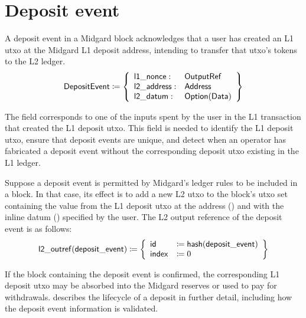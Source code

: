 \documentclass[../midgard.tex]{subfiles}
\begin{document}
\section{Deposit event}
\label{h:deposit-event}

A deposit event in a Midgard block acknowledges that a user has created an L1 utxo at the Midgard L1 deposit address, intending to transfer that utxo's tokens to the L2 ledger.
\begin{equation*}
    \mathsf{DepositEvent} \coloneq \left\{
    \begin{array}{ll}
        \mathsf{l1\_nonce} : & \mathsf{OutputRef} \\
        \mathsf{l2\_address} : & \mathsf{Address} \\
        \mathsf{l2\_datum} : & \mathsf{Option(Data)} \\
    \end{array} \right\}
\end{equation*}

The  field corresponds to one of the inputs spent by the user in the L1 transaction that created the L1 deposit utxo. This field is needed to identify the L1 deposit utxo, ensure that deposit events are unique, and detect when an operator has fabricated a deposit event without the corresponding deposit utxo existing in the L1 ledger.

Suppose a deposit event is permitted by Midgard's ledger rules to be included in a block. In that case, its effect is to add a new L2 utxo to the block's utxo set containing the value from the L1 deposit utxo at the address () and with the inline datum () specified by the user. The L2 output reference of the deposit event is as follows: 
\begin{equation*}
    \mathsf{l2\_outref(deposit\_event)} \coloneq \left\{
    \begin{array}{ll}
        \mathsf{id} &\coloneq \mathsf{hash(deposit\_event)} \\
        \mathsf{index} &\coloneq 0
    \end{array} \right\}
\end{equation*}

If the block containing the deposit event is confirmed, the corresponding L1 deposit utxo may be absorbed into the Midgard reserves or used to pay for withdrawals.  describes the lifecycle of a deposit in further detail, including how the deposit event information is validated.
\end{document}
